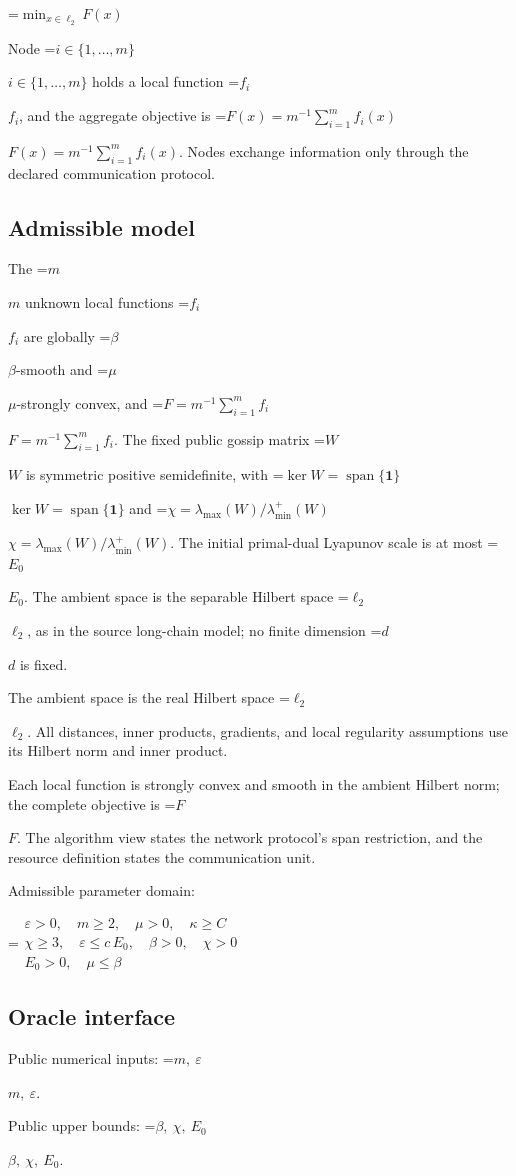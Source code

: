 \documentclass[10pt,a4paper]{article}
\newcommand{\AtlasMath}[1]{\par\begingroup\centering\setbox0=\hbox{$\displaystyle #1$}\ifdim\wd0>1.4\linewidth\typeout{ATLAS WIDE FORMULA: \the\wd0}\fi\ifdim\wd0>\linewidth\resizebox{\linewidth}{!}{\box0}\else\box0\fi\par\endgroup}
\newcommand{\AtlasInlineMath}[1]{\begingroup\setbox0=\hbox{$#1$}\ifdim\wd0>.4\linewidth\endgroup\AtlasMath{#1}\else\endgroup$#1$\fi}
\begin{document}
\AtlasMath{\min_{x\in \ell_2}F(x)}


Node \AtlasInlineMath{i\in\{1,\ldots,m\}} holds a local function \AtlasInlineMath{f_i}, and the aggregate objective is \AtlasInlineMath{F(x)=m^{-1}\sum_{i=1}^m f_i(x)}. Nodes exchange information only through the declared communication protocol.

\subsection{Admissible model}
The \AtlasInlineMath{m} unknown local functions \AtlasInlineMath{f_i} are globally \AtlasInlineMath{\beta}-smooth and \AtlasInlineMath{\mu}-strongly convex, and \AtlasInlineMath{F=m^{-1}\sum_{i=1}^m f_i}. The fixed public gossip matrix \AtlasInlineMath{W} is symmetric positive semidefinite, with \AtlasInlineMath{\ker W=\operatorname{span}\{\mathbf1\}} and \AtlasInlineMath{\chi=\lambda_{\max}(W)/\lambda_{\min}^{+}(W)}. The initial primal-dual Lyapunov scale is at most \AtlasInlineMath{E_0}. The ambient space is the separable Hilbert space \AtlasInlineMath{\ell_2}, as in the source long-chain model; no finite dimension \AtlasInlineMath{d} is fixed.

The ambient space is the real Hilbert space \AtlasInlineMath{\ell_2}. All distances, inner products, gradients, and local regularity assumptions use its Hilbert norm and inner product.

Each local function is strongly convex and smooth in the ambient Hilbert norm; the complete objective is \AtlasInlineMath{F}. The algorithm view states the network protocol's span restriction, and the resource definition states the communication unit.

Admissible parameter domain:


\AtlasMath{\begin{gathered}\varepsilon > 0,\quad m \ge 2,\quad \mu > 0,\quad \kappa \ge C\\\chi \ge 3,\quad \varepsilon \le c\,E_0,\quad \beta > 0,\quad \chi > 0\\E_0 > 0,\quad \mu \le \beta\end{gathered}}


\subsection{Oracle interface}
Public numerical inputs: \AtlasInlineMath{m,\ \varepsilon}.

Public upper bounds: \AtlasInlineMath{\beta,\ \chi,\ E_0}.
\end{document}
